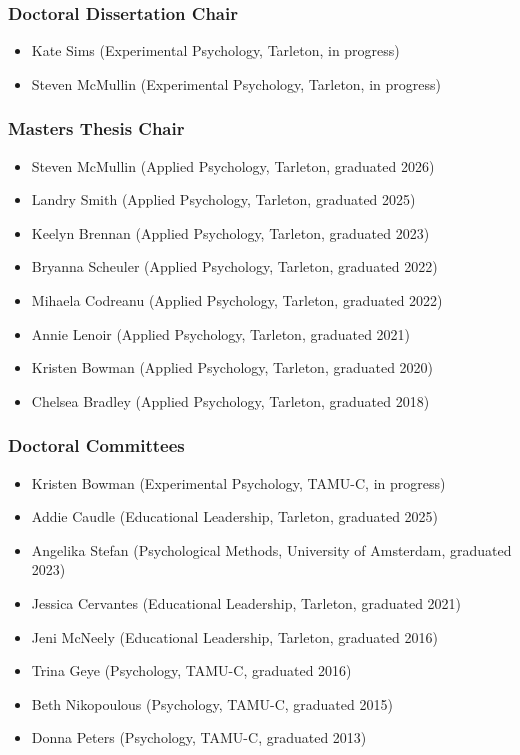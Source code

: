 \documentclass[article,10pt]{article}
\begin{document}
\subsubsection*{Doctoral Dissertation Chair}
\label{sec:orgaa0344d}
\begin{itemize}
\item Kate Sims (Experimental Psychology, Tarleton, in progress)
\item Steven McMullin (Experimental Psychology, Tarleton, in progress)
\end{itemize}
\subsubsection*{Masters Thesis Chair}
\label{sec:org890619a}
\begin{itemize}
\item Steven McMullin (Applied Psychology, Tarleton, graduated 2026)
\item Landry Smith (Applied Psychology, Tarleton, graduated 2025)
\item Keelyn Brennan (Applied Psychology, Tarleton, graduated 2023)
\item Bryanna Scheuler (Applied Psychology, Tarleton, graduated 2022)
\item Mihaela Codreanu (Applied Psychology, Tarleton, graduated 2022)
\item Annie Lenoir (Applied Psychology, Tarleton, graduated 2021)
\item Kristen Bowman (Applied Psychology, Tarleton, graduated 2020)
\item Chelsea Bradley (Applied Psychology, Tarleton, graduated 2018)
\end{itemize}
\subsubsection*{Doctoral Committees}
\label{sec:orge04ae09}
\begin{itemize}
\item Kristen Bowman (Experimental Psychology, TAMU-C, in progress)
\item Addie Caudle (Educational Leadership, Tarleton, graduated 2025)
\item Angelika Stefan (Psychological Methods, University of Amsterdam, graduated 2023)
\item Jessica Cervantes (Educational Leadership, Tarleton, graduated 2021)
\item Jeni McNeely (Educational Leadership, Tarleton, graduated 2016)
\item Trina Geye (Psychology, TAMU-C, graduated 2016)
\item Beth Nikopoulous (Psychology, TAMU-C, graduated 2015)
\item Donna Peters (Psychology, TAMU-C, graduated 2013)
\end{itemize}
\end{document}
